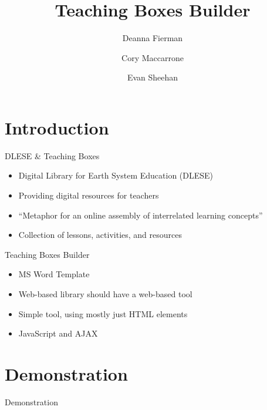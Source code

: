 \documentclass[style=simple,mode=present,paper=screen]{powerdot}
\title{Teaching Boxes Builder}
\author{
	Deanna Fierman
	\and
	Cory Maccarrone
	\and
	Evan Sheehan
}
\begin{document}
\maketitle

\section[slide=false]{Introduction}
\begin{slide}{DLESE \& Teaching Boxes}
\begin{itemize}
\item Digital Library for Earth System Education (DLESE)
\item Providing digital resources for teachers
\item ``Metaphor for an online assembly of interrelated learning concepts''
\item Collection of lessons, activities, and resources
\end{itemize}
\end{slide}

\begin{slide}{Teaching Boxes Builder}
\begin{itemize}
\item MS Word Template
\item Web-based library should have a web-based tool
\item Simple tool, using mostly just HTML elements
\item JavaScript and AJAX
\end{itemize}
\end{slide}

\section[slide=false]{Demonstration}
\begin{slide}[toc=,bm=]{Demonstration}
\end{slide}
\end{document}

